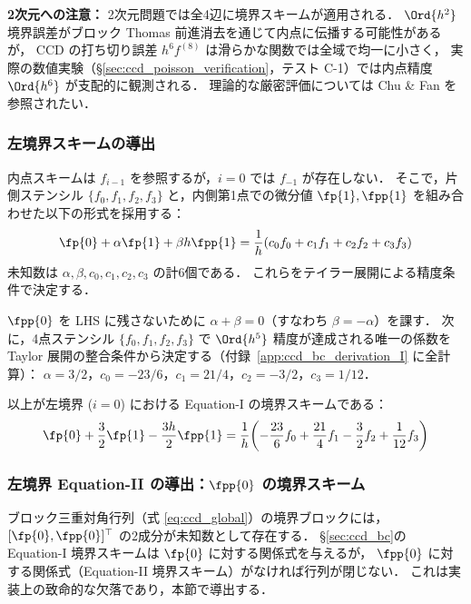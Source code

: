 \begin{tcolorbox}[warnbox, title={境界スキームの役割と精度}]
\textbf{2次元への注意：} 2次元問題では全4辺に境界スキームが適用される．
$\Ord{h^2}$ 境界誤差がブロック Thomas 前進消去を通じて内点に伝播する可能性があるが，
CCD の打ち切り誤差 $h^6 f^{(8)}$ は滑らかな関数では全域で均一に小さく，
実際の数値実験（§\ref{sec:ccd_poisson_verification}，テスト C-1）では内点精度 $\Ord{h^6}$ が支配的に観測される．
理論的な厳密評価については Chu \& Fan \cite{ChuFan1998} を参照されたい．
\end{tcolorbox}

\subsubsection{左境界スキームの導出}

内点スキームは $f_{i-1}$ を参照するが，$i=0$ では $f_{-1}$ が存在しない．
そこで，片側ステンシル $\{f_0, f_1, f_2, f_3\}$ と，内側第1点での微分値 $\fp{1}, \fpp{1}$ を組み合わせた以下の形式を採用する：
\begin{equation}
  \fp{0} + \alpha\fp{1} + \beta h\fpp{1}
  = \frac{1}{h}\!\left(c_0 f_0 + c_1 f_1 + c_2 f_2 + c_3 f_3\right)
  \label{eq:bc_general}
\end{equation}
未知数は $\alpha, \beta, c_0, c_1, c_2, c_3$ の計6個である．
これらをテイラー展開による精度条件で決定する．

$\fpp{0}$ を LHS に残さないために $\alpha+\beta=0$（すなわち $\beta=-\alpha$）を課す．
次に，4点ステンシル $\{f_0,f_1,f_2,f_3\}$ で $\Ord{h^5}$ 精度が達成される唯一の係数を
Taylor 展開の整合条件から決定する（付録~\ref{app:ccd_bc_derivation_I} に全計算）：
$\alpha = 3/2$，$c_0 = -23/6$，$c_1 = 21/4$，$c_2 = -3/2$，$c_3 = 1/12$．

以上が左境界 ($i=0$) における Equation-I の境界スキームである：
\begin{equation}
  \fp{0} + \frac{3}{2}\fp{1} - \frac{3h}{2}\fpp{1}
  = \frac{1}{h}\!\left(-\frac{23}{6}f_0 + \frac{21}{4}f_1 - \frac{3}{2}f_2 + \frac{1}{12}f_3\right)
  \label{eq:bc_left}
\end{equation}

\subsubsection{左境界 Equation-II の導出：$\fpp{0}$ の境界スキーム}
\label{sec:ccd_bc_II}

\begin{tcolorbox}[warnbox, title={Equation-II 境界スキームの必要性}]
ブロック三重対角行列（式 \eqref{eq:ccd_global}）の境界ブロックには，
$[\fp{0},\fpp{0}]^\top$ の2成分が未知数として存在する．
§\ref{sec:ccd_bc}の Equation-I 境界スキームは $\fp{0}$ に対する関係式を与えるが，
$\fpp{0}$ に対する関係式（Equation-II 境界スキーム）がなければ行列が閉じない．
これは実装上の致命的な欠落であり，本節で導出する．
\end{tcolorbox}

